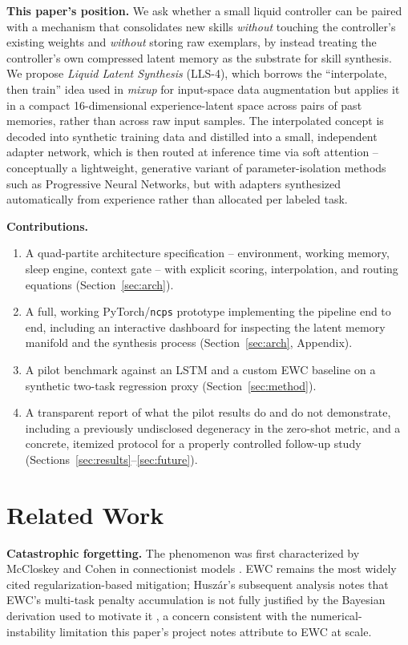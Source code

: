 \documentclass[11pt]{article}
\begin{document}
\textbf{This paper's position.} We ask whether a small liquid controller can be paired with a mechanism that consolidates new skills \emph{without} touching the controller's existing weights and \emph{without} storing raw exemplars, by instead treating the controller's own compressed latent memory as the substrate for skill synthesis. We propose \emph{Liquid Latent Synthesis} (LLS-4), which borrows the ``interpolate, then train'' idea used in \emph{mixup} for input-space data augmentation \cite{zhang2018} but applies it in a compact 16-dimensional experience-latent space across pairs of past memories, rather than across raw input samples. The interpolated concept is decoded into synthetic training data and distilled into a small, independent adapter network, which is then routed at inference time via soft attention -- conceptually a lightweight, generative variant of parameter-isolation methods such as Progressive Neural Networks, but with adapters synthesized automatically from experience rather than allocated per labeled task.

\textbf{Contributions.}
\begin{enumerate}
\item A quad-partite architecture specification -- environment, working memory, sleep engine, context gate -- with explicit scoring, interpolation, and routing equations (Section~\ref{sec:arch}).
\item A full, working PyTorch/\texttt{ncps} prototype implementing the pipeline end to end, including an interactive dashboard for inspecting the latent memory manifold and the synthesis process (Section~\ref{sec:arch}, Appendix).
\item A pilot benchmark against an LSTM and a custom EWC baseline on a synthetic two-task regression proxy (Section~\ref{sec:method}).
\item A transparent report of what the pilot results do and do not demonstrate, including a previously undisclosed degeneracy in the zero-shot metric, and a concrete, itemized protocol for a properly controlled follow-up study (Sections~\ref{sec:results}--\ref{sec:future}).
\end{enumerate}

\section{Related Work}
\label{sec:related}

\textbf{Catastrophic forgetting.} The phenomenon was first characterized by McCloskey and Cohen in connectionist models \cite{mccloskey1989}. EWC \cite{kirkpatrick2017} remains the most widely cited regularization-based mitigation; Huszár's subsequent analysis notes that EWC's multi-task penalty accumulation is not fully justified by the Bayesian derivation used to motivate it \cite{huszar2018}, a concern consistent with the numerical-instability limitation this paper's project notes attribute to EWC at scale.
\end{document}
